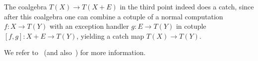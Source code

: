 \documentclass{LMCS}
\newif\ifignore \ignorefalse
\newcommand{\auxproof}[1]{
\ifignore\mbox{}\newline
\textbf{PROOF:} \dotfill\newline
{\it #1}\mbox{}\newline
\textbf{ENDPROOF}\dotfill
\fi}
\newcommand{\after}{\mathrel{\circ}}
\newcommand{\idmap}[1][]{\ensuremath{\mathrm{id}_{#1}}}
\newcommand{\E}{\ensuremath{\mathcal{E}}}
\begin{document}
\noindent The coalgebra $T(X) \rightarrow T(X+E)$ in the third point
indeed does a catch, since after this coalgebra one can combine a
cotuple of a normal computation $f\colon X \rightarrow T(Y)$ with an
exception handler $g\colon E\rightarrow T(Y)$ in cotuple $[f,g] \colon
X+E \rightarrow T(Y)$, yielding a catch map $T(X) \rightarrow T(Y)$.

We refer to~\cite{Levy06} (and also~\cite{SchroderM04}) for more
information.

\auxproof{
We write $\eta,\mu$ of the monad of $T$, and define
$\eta^{\E(T)}$ and $\mu^{\E(T)}$ for $\E(T) = T(E+-)$,
in the following way.
$$\xymatrix@R-1.5pc{
\eta^{\E(T)} = \Big(X\ar[r]^-{\eta} & T(X)\ar[r]^-{T(\kappa_{2})} &
   T(E+X)\Big) \\
\mu^{\E(T)} = \Big(T(E + T(E + X))
   \ar[rr]^-{T([T(\kappa_{1})\after\eta, \idmap])}
   & & T^{2}(E+X)\ar[r]^-{\mu} & T(E+X)\Big)
}$$

\noindent Then:
$$\begin{array}{rcl}
\big(\mu^{\E(T)}_{X} \after \eta^{\E(T)}_{T(E+X)}\big)
& = &
\mu \after T([T(\kappa_{1})\after\eta, \idmap]) \after T(\kappa_{2})
   \after \eta \\
& = &
\mu \after T(\idmap) \after \eta \\
& = &
\idmap \\
\big(\mu^{\E(T)}_{X} \after T(E+\eta^{\E(T)}_{X})\big)
& = &
\mu \after T([T(\kappa_{1})\after\eta, \idmap]) \after 
   T([\kappa_{1}, \kappa_{2} \after T(\kappa_{2}) \after \eta]) \\
& = &
\mu \after T([T(\kappa_{1})\after\eta, T(\kappa_{2}) \after \eta]) \\
& = &
\mu \after T([\eta \after \kappa_{1}, \eta \after \kappa_{2}]) \\
& = &
\mu \after T(\eta) \after T([\kappa_{1}, \kappa_{2}]) \\
& = &
\idmap \after T(\idmap) \\
& = &
\idmap \\
\big(\mu^{\E(T)}_{X} \after T(E+\mu^{\E(T)}_{X})\big) 
& = &
\mu \after T([T(\kappa_{1})\after\eta, \idmap]) \after 
   T([\kappa_{1}, \kappa_{2} \after \mu \after 
      T([T(\kappa_{1})\after\eta, \idmap])]) \\
& = &
\mu \after T([T(\kappa_{1})\after\eta, \mu \after 
      T([T(\kappa_{1})\after\eta, \idmap])]) \\
& = &
\mu \after T([\mu \after \eta \after T(\kappa_{1})\after\eta, 
   \mu \after T([T(\kappa_{1})\after\eta, \idmap])]) \\
& = &
\mu \after T(\mu) \after T([T(T(\kappa_{1})\after\eta) \after \eta, 
   T([T(\kappa_{1})\after\eta, \idmap])]) \\
& = &
\mu \after \mu \after T^{2}([T(\kappa_{1})\after\eta, \idmap]) \after
   T([T(\kappa_{1})\after\eta, \idmap]) \\
& = &
\mu \after T([T(\kappa_{1})\after\eta, \idmap]) \after
   \mu \after T([T(\kappa_{1})\after\eta, \idmap]) \\
& = &
\big(\mu^{\E(T)}_{X} \after \mu^{\E(T)}_{T(E+X)}\big)
\end{array}$$

}
\end{document}
